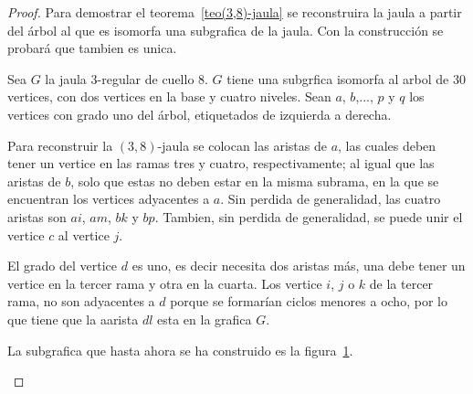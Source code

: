 \documentclass[12pt]{book}
\theoremstyle{definition}
\begin{document}
\begin{proof} Para demostrar el teorema~\ref{teo(3,8)-jaula} se
  reconstruira la jaula a partir del árbol al que es isomorfa una
  subgrafica de la jaula. Con la construcción se probará que tambien
  es unica.

Sea $G$ la jaula 3-regular de cuello 8. $G$ tiene una subgrfica
isomorfa al arbol de 30 vertices, con dos vertices en la base y cuatro
niveles. Sean $a$, $b$,..., $p$ y $q$ los vertices con grado uno del
árbol, etiquetados de izquierda a derecha.

Para reconstruir la $(3,8)$-jaula se colocan las
aristas de $a$, las cuales deben tener un vertice en las ramas tres y
cuatro, respectivamente; al igual que las aristas de $b$, solo que
estas no deben estar en la misma subrama, en la que se encuentran los vertices
adyacentes a $a$. Sin perdida de generalidad, las cuatro aristas son
$ai$, $am$, $bk$ y $bp$. Tambien, sin perdida de generalidad, se puede
unir el vertice $c$ al vertice $j$. 

El grado del vertice $d$ es uno, es decir necesita dos aristas más,
una debe tener un vertice en la tercer rama y otra en la cuarta. Los
vertice $i$, $j$ o $k$ de la tercer rama, no son adyacentes a $d$
porque se formarían ciclos menores a ocho, por lo que tiene que la
aarista $dl$ esta en la grafica $G$. 

La subgrafica que hasta ahora se ha construido es la figura~\ref{arbol(3,8)}.


\begin{figure}
  \centering
  \caption{} \label{arbol(3,8)}
\end{figure}


\end{proof}
\end{document}
